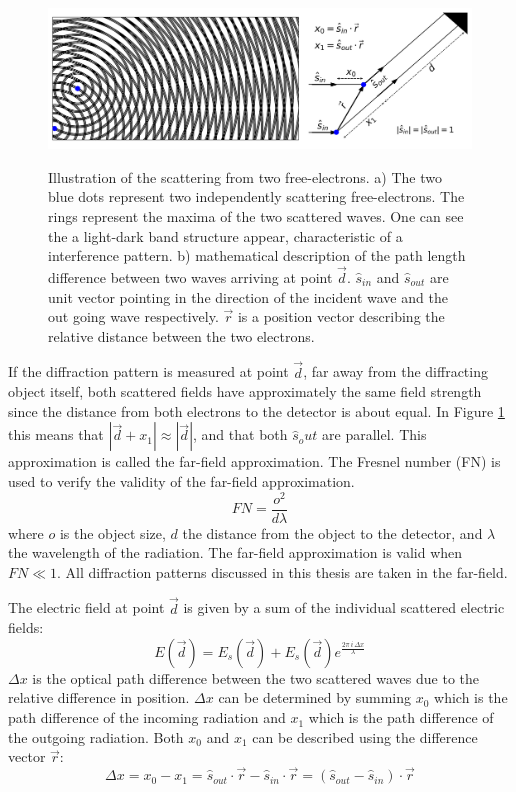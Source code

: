 \begin{figure}[h]
\centering 
\includegraphics[width=120mm]{InterferenceTwoElectrons3.png}
\label{fig:Interference}
\caption{Illustration of the scattering from two free-electrons. a) The two blue dots represent two independently scattering free-electrons. The rings represent the maxima of the two scattered waves. One can see the a light-dark band structure appear, characteristic of a interference pattern. b) mathematical description of the path length difference between two waves arriving at point $\vec{d}$. $\hat{s}_{in}$ and $\hat{s}_{out}$ are unit vector pointing in the direction of the incident wave and the out going wave respectively. $\vec{r}$ is a position vector describing the relative distance between the two electrons. }
\end{figure}

If the diffraction pattern is measured at point \(\vec{d}\), far away from the diffracting object itself, both scattered fields have approximately the same field strength since the distance from both electrons to the detector is about equal. In Figure \ref{fig:Interference} this means that  $|\vec{d}+x_1| \approx |\vec{d}|$, and that both $\hat{s}_out$ are parallel. This approximation is called the far-field approximation. The Fresnel number (FN) is used to verify the validity of the far-field approximation.
\begin{equation} 
FN = \frac{o^2}{d\lambda}
\end{equation}
where $o$ is the object size, $d$ the distance from the
object to the detector, and \(\lambda\) the
wavelength of the radiation. The far-field approximation is valid when $FN \ll 1$. All diffraction patterns discussed
in this thesis are taken in the far-field. 

The electric field at point $\vec{d}$ is given by a sum of the individual scattered electric fields:
\begin{equation}
E(\vec{d}) = E_s(\vec{d})+E_s(\vec{d}) e^{\frac{2 \pi\,i\,\Delta x}{\lambda}} 	 
\end{equation}
$\Delta x$ is the optical path difference between the two scattered waves due to the relative difference in position. $\Delta x$ can be determined by summing $x_0$ which is the path difference of the incoming radiation and $x_1$ which is the path difference of the outgoing radiation. Both $x_0$ and $x_1$ can be described using the difference vector $\vec{r}$: 
\begin{equation}
\Delta x = x_0 - x_1 =\hat{s}_{out} \cdot \vec{r}-\hat{ s}_{in}\cdot \vec{r} = (\hat{s}_{out} -\hat{s}_{in} ) \cdot \vec{r} 
\end{equation}

